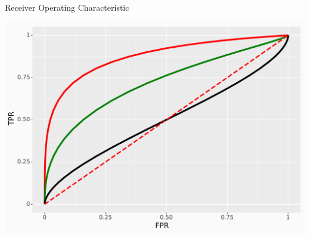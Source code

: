 \documentclass[10pt, xcolor=table]{beamer}
\begin{document}
\begin{frame}{Receiver Operating Characteristic}
	\begin{center}
  {\includegraphics[width=1\textwidth]{images/ROC_dist_diff.pdf}}\\
	\end{center}
\end{frame}
\end{document}
